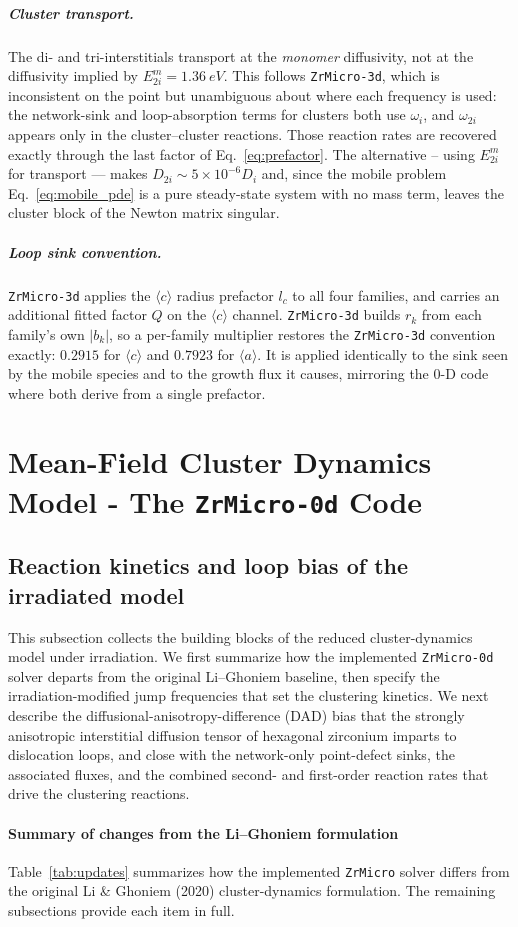 \documentclass{article}
\newcommand{\aloop}{\ensuremath{\langle a\rangle}}
\newcommand{\cloop}{\ensuremath{\langle c\rangle}}
\newcommand{\ZrM}{\texttt{ZrMicro-3d}}
\begin{document}
\subparagraph{Cluster transport.} The di- and tri-interstitials transport at the
\emph{monomer} diffusivity, not at the diffusivity implied by
$E^m_{2i}=1.36~eV$. This follows \ZrM{}, which is inconsistent on the point
but unambiguous about where each frequency is used: the network-sink and
loop-absorption terms for clusters both use $\omega_i$, and $\omega_{2i}$ appears
only in the cluster--cluster reactions. Those reaction rates are recovered
exactly through the last factor of Eq.~\eqref{eq:prefactor}. The alternative --
using $E^m_{2i}$ for transport --- makes $D_{2i}\sim 5\times10^{-6}D_i$ and, since
the mobile problem Eq.~\eqref{eq:mobile_pde} is a pure steady-state system with no
mass term, leaves the cluster block of the Newton matrix singular.

\subparagraph{Loop sink convention.} \ZrM{} applies the \cloop{} radius prefactor
$l_c$ to all four families, and carries an additional fitted factor $Q$ on the
\cloop{} channel. \ZrM{} builds $r_k$ from each family's own $|b_k|$, so a
per-family multiplier restores the \ZrM{} convention exactly:
$0.2915$ for \cloop{} and $0.7923$ for \aloop{}. It is applied identically to the
sink seen by the mobile species and to the growth flux it causes, mirroring the
0-D code where both derive from a single prefactor.

\section{Mean-Field Cluster Dynamics Model - The \texttt{ZrMicro-0d} Code}\label{app:A}

\subsection{Reaction kinetics and loop bias of the irradiated model}
This subsection collects the building blocks of the reduced cluster-dynamics model under irradiation. We first summarize how the implemented \texttt{ZrMicro-0d} solver departs from the original Li–Ghoniem baseline, then specify the irradiation-modified jump frequencies that set the clustering kinetics. We next describe the diffusional-anisotropy-difference (DAD) bias that the strongly anisotropic interstitial diffusion tensor of hexagonal zirconium imparts to dislocation loops, and close with the network-only point-defect sinks, the associated fluxes, and the combined second- and first-order reaction rates that drive the clustering reactions.

\paragraph{Summary of changes from the Li--Ghoniem formulation}
Table~\ref{tab:updates} summarizes how the implemented \texttt{ZrMicro} solver
differs from the original Li \& Ghoniem (2020) cluster-dynamics formulation. The
remaining subsections provide each item in full.
\end{document}
